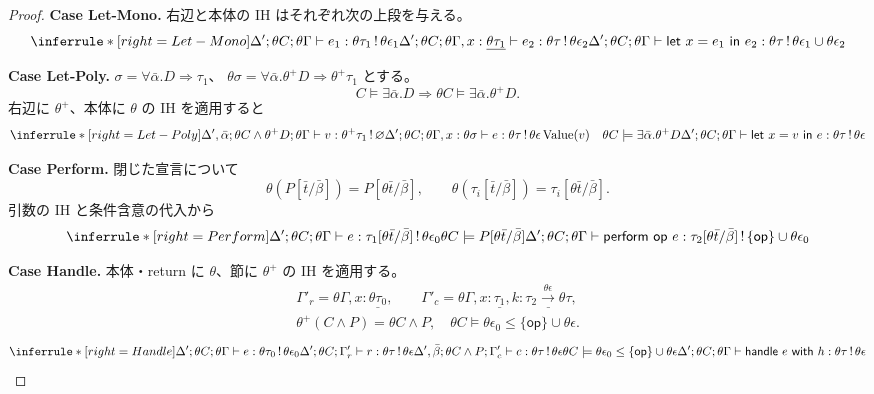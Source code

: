 \documentclass[a4paper,11pt]{article}
\theoremstyle{definition}
\newenvironment{Case}[1]{\par\smallskip\noindent\textbf{Case #1.}\enspace\ignorespaces}{\par}
\newcommand{\op}{\mathsf{op}}
\newcommand{\emp}{\varnothing}
\newcommand{\arr}[3]{#1\xrightarrow{#2}#3}
\newcommand{\jj}[6]{#1;#2;#3\vdash #4:#5\,!\,#6}
\newcommand{\lete}[3]{\mathsf{let}\ #1=#2\ \mathsf{in}\ #3}
\newcommand{\perform}[2]{\mathsf{perform}\ #1\ #2}
\newcommand{\handle}[2]{\mathsf{handle}\ #1\ \mathsf{with}\ #2}
\newcommand{\mono}[1]{\underline{#1}}
\newcommand{\Val}{\operatorname{Value}}
\begin{document}
\begin{proof}
\begin{Case}{Let-Mono}
右辺と本体の IH はそれぞれ次の上段を与える。
\[
\inferrule*[right=Let-Mono]{\jj{\Delta'}{\theta C}{\theta\Gamma}{e_1}{\theta\tau_1}{\theta\epsilon_1}\\\jj{\Delta'}{\theta C}{\theta\Gamma,x:\mono{\theta\tau_1}}{e_2}{\theta\tau}{\theta\epsilon_2}}{\jj{\Delta'}{\theta C}{\theta\Gamma}{\lete x{e_1}{e_2}}{\theta\tau}{\theta\epsilon_1\cup\theta\epsilon_2}}
\]
\end{Case}

\begin{Case}{Let-Poly}
$\sigma=\forall\bar\alpha.D\Rightarrow\tau_1$、
$\theta\sigma=\forall\bar\alpha.\theta^+D\Rightarrow\theta^+\tau_1$ とする。
\[
 C\models\exists\bar\alpha.D\Longrightarrow
 \theta C\models\exists\bar\alpha.\theta^+D.
\]
右辺に $\theta^+$、本体に $\theta$ の IH を適用すると
\[
\inferrule*[right=Let-Poly]{\jj{\Delta',\bar\alpha}{\theta C\land\theta^+D}{\theta\Gamma}{v}{\theta^+\tau_1}{\emp}\\\jj{\Delta'}{\theta C}{\theta\Gamma,x:\theta\sigma}{e}{\theta\tau}{\theta\epsilon}\\\Val(v)\quad\theta C\models\exists\bar\alpha.\theta^+D}{\jj{\Delta'}{\theta C}{\theta\Gamma}{\lete x v e}{\theta\tau}{\theta\epsilon}}
\]
\end{Case}

\begin{Case}{Perform}
閉じた宣言について
\[
 \theta(P[\bar t/\bar\beta])=P[\theta\bar t/\bar\beta],\qquad
 \theta(\tau_i[\bar t/\bar\beta])=\tau_i[\theta\bar t/\bar\beta].
\]
引数の IH と条件含意の代入から
\[
\inferrule*[right=Perform]{\jj{\Delta'}{\theta C}{\theta\Gamma}{e}{\tau_1[\theta\bar t/\bar\beta]}{\theta\epsilon_0}\\\theta C\models P[\theta\bar t/\bar\beta]}{\jj{\Delta'}{\theta C}{\theta\Gamma}{\perform\op e}{\tau_2[\theta\bar t/\bar\beta]}{\{\op\}\cup\theta\epsilon_0}}
\]
\end{Case}

\begin{Case}{Handle}
本体・return に $\theta$、節に $\theta^+$ の IH を適用する。
\begin{gather*}
 \Gamma'_r=\theta\Gamma,x:\mono{\theta\tau_0},\qquad
 \Gamma'_c=\theta\Gamma,x:\mono{\tau_1},k:\mono{\arr{\tau_2}{\theta\epsilon}{\theta\tau}},\\
 \theta^+(C\land P)=\theta C\land P,\quad
 \theta C\models\theta\epsilon_0\leq\{\op\}\cup\theta\epsilon.
\end{gather*}
\[
\inferrule*[right=Handle]{\jj{\Delta'}{\theta C}{\theta\Gamma}{e}{\theta\tau_0}{\theta\epsilon_0}\\\jj{\Delta'}{\theta C}{\Gamma'_r}{r}{\theta\tau}{\theta\epsilon}\\\jj{\Delta',\bar\beta}{\theta C\land P}{\Gamma'_c}{c}{\theta\tau}{\theta\epsilon}\\\theta C\models\theta\epsilon_0\leq\{\op\}\cup\theta\epsilon}{\jj{\Delta'}{\theta C}{\theta\Gamma}{\handle e h}{\theta\tau}{\theta\epsilon}}
\]
\end{Case}


\end{proof}
\end{document}
